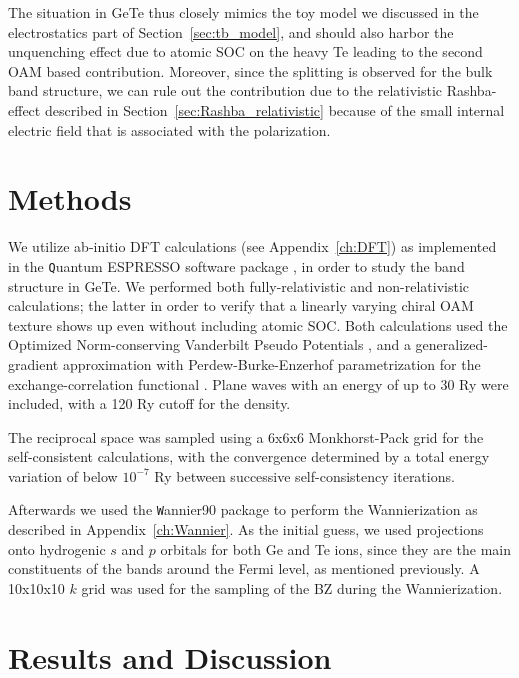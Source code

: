 The situation in GeTe thus closely mimics the toy model we discussed in the electrostatics part of Section~\ref{sec:tb_model}, and should also harbor the unquenching effect due to atomic SOC on the heavy Te leading to the second OAM based contribution.
Moreover, since the splitting is observed for the bulk band structure, we can rule out the contribution due to the relativistic Rashba-effect described in Section~\ref{sec:Rashba_relativistic} because of the small internal electric field that is associated with the polarization.

\section{Methods}
We utilize ab-initio DFT calculations (see Appendix~\ref{ch:DFT}) as implemented in the {\texttt Quantum ESPRESSO} software package \cite{Giannozzi2009}, in order to study the band structure in GeTe.
We performed both fully-relativistic and non-relativistic calculations; the latter in order to verify that a linearly varying chiral OAM texture shows up even without including atomic SOC.
Both calculations used the Optimized Norm-conserving Vanderbilt Pseudo Potentials \cite{Hamann2013}, and a generalized-gradient approximation \cite{Perdew1993} with Perdew-Burke-Enzerhof parametrization for the exchange-correlation functional \cite{Perdew1996}.
Plane waves with an energy of up to 30 Ry were included, with a 120 Ry cutoff for the density.

The reciprocal space was sampled using a 6x6x6 Monkhorst-Pack grid \cite{Pack1977} for the self-consistent calculations, with the convergence determined by a total energy variation of below $10^{-7}$ Ry between successive self-consistency iterations.

Afterwards we used the {\texttt Wannier90} package \cite{Mostofi2014AnFunctions} to perform the Wannierization as described in Appendix~\ref{ch:Wannier}.
As the initial guess, we used projections onto hydrogenic $s$ and $p$ orbitals for both Ge and Te ions, since they are the main constituents of the bands around the Fermi level, as mentioned previously.
A 10x10x10 $k$ grid was used for the sampling of the BZ during the Wannierization. 

\section{Results and Discussion}

